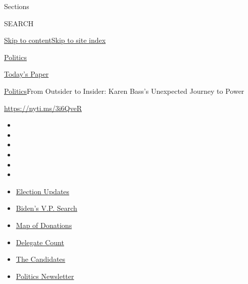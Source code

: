 Sections

SEARCH

\protect\hyperlink{site-content}{Skip to
content}\protect\hyperlink{site-index}{Skip to site index}

\href{https://www.nytimes.com/section/politics}{Politics}

\href{https://myaccount.nytimes.com/auth/login?response_type=cookie\&client_id=vi}{}

\href{https://www.nytimes.com/section/todayspaper}{Today's Paper}

\href{/section/politics}{Politics}\textbar{}From Outsider to Insider:
Karen Bass's Unexpected Journey to Power

\url{https://nyti.ms/3i6QveR}

\begin{itemize}
\item
\item
\item
\item
\item
\item
\end{itemize}

\begin{itemize}
\item
  \href{https://www.nytimes.com/2020/08/04/us/elections/primary-election-michigan-arizona-kansas.html?action=click\&pgtype=Article\&state=default\&region=TOP_BANNER\&context=storylines_menu}{Election
  Updates}
\item
  \href{https://www.nytimes.com/article/biden-vice-president-2020.html?action=click\&pgtype=Article\&state=default\&region=TOP_BANNER\&context=storylines_menu}{Biden's
  V.P. Search}
\item
  \href{https://www.nytimes.com/interactive/2020/07/24/us/politics/trump-biden-campaign-donors.html?action=click\&pgtype=Article\&state=default\&region=TOP_BANNER\&context=storylines_menu}{Map
  of Donations}
\item
  \href{https://www.nytimes.com/interactive/2020/us/elections/delegate-count-primary-results.html?action=click\&pgtype=Article\&state=default\&region=TOP_BANNER\&context=storylines_menu}{Delegate
  Count}
\item
  \href{https://www.nytimes.com/interactive/2019/us/politics/2020-presidential-candidates.html?action=click\&pgtype=Article\&state=default\&region=TOP_BANNER\&context=storylines_menu}{The
  Candidates}
\item
  \href{https://www.nytimes.com/newsletters/politics?action=click\&pgtype=Article\&state=default\&region=TOP_BANNER\&context=storylines_menu}{Politics
  Newsletter}
\end{itemize}

